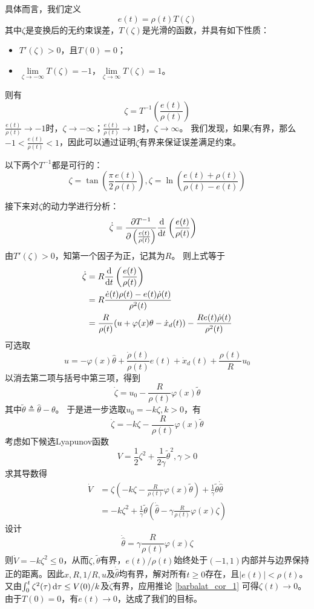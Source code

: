 具体而言，我们定义\[e(t)=\rho(t)T(\zeta)\]
其中$\zeta$是变换后的无约束误差，$T(\zeta)$是光滑的函数，并具有如下性质：
\begin{itemize}[leftmargin=1em]
    \item $T'(\zeta)>0$，且$T(0)=0$；
    \item $\lim\limits_{\zeta\to-\infty}T(\zeta)=-1$，$\lim\limits_{\zeta\to\infty}T(\zeta)=1$。
\end{itemize}
则有
\[\zeta = T^{-1}\left(\frac{e(t)}{\rho(t)}\right)\]
$\frac{e(t)}{\rho(t)}\to -1$时，$\zeta\to-\infty$；$\frac{e(t)}{\rho(t)}\to 1$时，$\zeta\to\infty$。
我们发现，如果$\zeta$有界，那么$-1<\frac{e(t)}{\rho(t)}<1$，因此可以通过证明$\zeta$有界来保证误差满足约束。

\begin{example}
    以下两个$T^{-1}$都是可行的：
    \[\zeta = \tan\left(\frac{\pi}{2}\frac{e(t)}{\rho(t)}\right),\zeta = \ln\left(\frac{e(t)+\rho(t)}{\rho(t)-e(t)}\right)\]
\end{example}

接下来对$\zeta$的动力学进行分析：
\begin{align*}
    \dot{\zeta} &= \frac{\partial T^{-1}}{\partial \left(\frac{e(t)}{\rho(t)}\right)}
    \frac{\mathop{}\!\mathrm{d}}{\mathop{}\!\mathrm{d} t}\left(\frac{e(t)}{\rho(t)}\right)
\end{align*}
由$T'(\zeta)>0$，知第一个因子为正，记其为$R$。
则上式等于
\begin{align*}
    \dot{\zeta} &= R
    \frac{\mathop{}\!\mathrm{d}}{\mathop{}\!\mathrm{d} t}\left(\frac{e(t)}{\rho(t)}\right)\\
    &=R\frac{\dot{e}(t)\rho(t)-e(t)\dot{\rho}(t)}{\rho^2(t)}\\
    &=\frac{R}{\rho(t)}(u+\varphi(x)\theta-\dot{x}_d(t))-\frac{Re(t)\dot{\rho}(t)}{\rho^2(t)}
\end{align*}
可选取\[u=-\varphi(x)\hat{\theta}+\frac{\dot{\rho}(t)}{\rho(t)}e(t)+\dot{x}_d(t)+\frac{\rho(t)}{R}u_0\]
以消去第二项与括号中第三项，得到
\[\dot{\zeta} = u_0-\frac{R}{\rho(t)}\varphi(x)\tilde{\theta}\]
其中$\tilde{\theta}\triangleq \hat{\theta}-\theta$。
于是进一步选取$u_0=-k\zeta,k>0$，有
\[\dot{\zeta} = -k\zeta-\frac{R}{\rho(t)}\varphi(x)\tilde{\theta}\]
考虑如下候选Lyapunov函数
\[V=\frac{1}{2}\zeta^2+\frac{1}{2\gamma}\tilde{\theta}^2,\gamma>0\]
求其导数得\begin{align*}
    \dot{V}&=\zeta\left(-k\zeta-\frac{R}{\rho(t)}\varphi(x)\tilde{\theta}\right)+\frac{1}{\gamma}\tilde{\theta}\dot{\hat{\theta}}\\
    &=-k\zeta^2+\frac{1}{\gamma}\tilde{\theta}\left(\dot{\hat{\theta}}-\gamma \frac{R}{\rho(t)}\varphi(x)\zeta\right)
\end{align*}
设计\[\dot{\hat{\theta}}=\gamma \frac{R}{\rho(t)}\varphi(x)\zeta\]
则$\dot{V}=-k\zeta^2\le 0$，从而$\zeta,\tilde\theta$有界，$e(t)/\rho(t)$始终处于$(-1,1)$内部并与边界保持正的距离。因此$x,R,1/R,u$及$\dot{\hat\theta}$均有界，解对所有$t\geq0$存在，且$|e(t)|<\rho(t)$。又由$\int_0^t\zeta^2(\tau)\mathop{}\!\mathrm{d}\tau\leq V(0)/k$及$\dot\zeta$有界，应用推论 \ref{barbalat_cor_1} 可得$\zeta(t)\to0$。由于$T(0)=0$，有$e(t)\to0$，达成了我们的目标。


